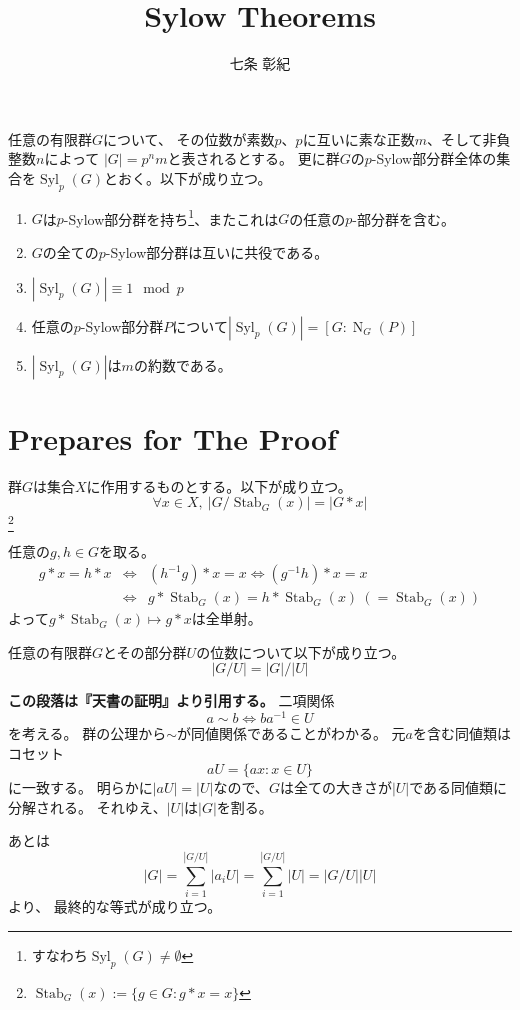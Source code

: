 \documentclass[a4paper]{jarticle}
\title{Sylow Theorems}
\author{七条 彰紀}
\newcommand{\Stab}{\operatorname{Stab}}
\newcommand{\Norm}{\operatorname{N}}
\newcommand{\Syl}{\operatorname{Syl}}
\begin{document}
\maketitle

\begin{Them}
    任意の有限群$G$について、
    その位数が素数$p$、$p$に互いに素な正数$m$、そして非負整数$n$によって
    $|G|=p^{n}m$と表されるとする。
    更に群$G$の$p$-Sylow部分群全体の集合を$\Syl_p(G)$とおく。以下が成り立つ。
    \begin{enumerate}
        \renewcommand{\labelenumi}{\Roman{enumi}.}
        \item $G$は$p$-Sylow部分群を持ち\footnote{すなわち$\Syl_p(G) \neq \emptyset$}、またこれは$G$の任意の$p$-部分群を含む。
        \item $G$の全ての$p$-Sylow部分群は互いに共役である。
        \item $|\Syl_p(G)| \equiv 1 \mod p$
        \item 任意の$p$-Sylow部分群$P$について$|\Syl_p(G)| = [G:\Norm_G(P)]$
        \item $|\Syl_p(G)|$は$m$の約数である。
    \end{enumerate}
\end{Them}

\section{Prepares for The Proof}
    \begin{Them}
        群$G$は集合$X$に作用するものとする。以下が成り立つ。
        \[ \forall x \in  X,~ |G / \Stab_G(x)|=|G \ast x| \]
        \footnote{$\Stab_G(x):=\{g \in G : g \ast x=x \}$}
    \end{Them}
    \begin{Proof}
        任意の$g, h \in G$を取る。
        \begin{eqnarray*}
            g \ast x=h \ast x
                &\iff& (h^{-1}g) \ast x=x \iff (g^{-1}h) \ast x=x \\
                &\iff& g \ast \Stab_G(x)= h \ast \Stab_G(x) ~(=\Stab_G(x))
        \end{eqnarray*}
        よって$g \ast \Stab_G(x) \mapsto g \ast x$は全単射。
        \QED
    \end{Proof}

    \begin{Them}
        任意の有限群$G$とその部分群$U$の位数について以下が成り立つ。
        \[ |G/U|=|G|/|U| \]
    \end{Them}
    \begin{Proof}
        \textbf{この段落は『天書の証明』より引用する。}
        二項関係\[ a \sim b \iff ba^{-1} \in U \]を考える。
        群の公理から$\sim$が同値関係であることがわかる。
        元$a$を含む同値類はコセット\[ aU=\{ ax : x \in U \} \]に一致する。
        明らかに$|aU|=|U|$なので、$G$は全ての大きさが$|U|$である同値類に分解される。
        それゆえ、$|U|$は$|G|$を割る。

        あとは
        \[ |G|=\sum_{i=1}^{|G/U|}{|a_i U|}=\sum_{i=1}^{|G/U|}{|U|}=|G/U||U| \]より、
        最終的な等式が成り立つ。
        \QED
    \end{Proof}
\end{document}
